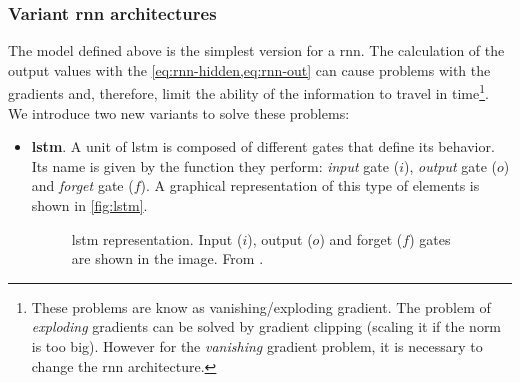 \subsubsection{Variant \gls*{rnn} architectures}
The model defined above is the simplest version for a \gls{rnn}. The
calculation of the output values with the \vref{eq:rnn-hidden,eq:rnn-out} can
cause problems with the gradients and, therefore, limit the ability of the
information to travel in time\footnote{These problems are know as
  vanishing/exploding gradient. The problem of \emph{exploding} gradients can
  be solved by gradient clipping (scaling it if the norm is too big). However
  for the \emph{vanishing} gradient problem, it is necessary to change the
  \gls{rnn} architecture.}. We introduce two new variants to solve these
problems:
\begin{itemize}
  \item \textbf{\gls*{lstm}}. A unit of \gls{lstm} is composed of different
  gates that define its behavior. Its name is given by the function they
  perform: \emph{input} gate (\(i\)), \emph{output} gate (\(o\)) and
  \emph{forget} gate (\(f\)). A graphical representation of this type of
  elements is shown in \vref{fig:lstm}.
  \begin{figure}[ht]
    \centering
    
    \caption[\acl*{lstm}]{\acf{lstm} representation. Input (\(i\)), output
      (\(o\)) and forget (\(f\)) gates are shown in the image. From
      .}\label{fig:lstm}
  \end{figure}


\end{itemize}
